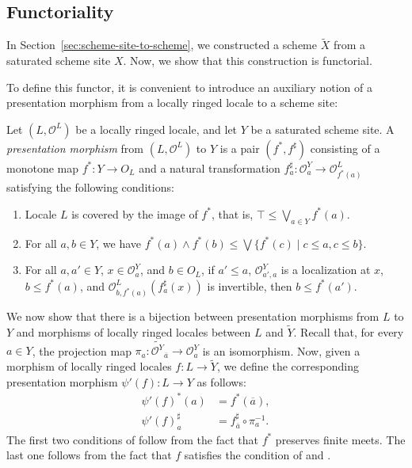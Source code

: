 \documentclass[reqno]{amsart}
\theoremstyle{definition}
\theoremstyle{remark}
\numberwithin{figure}{section}
\begin{document}
\subsection{Functoriality}
\label{sec:functor}

In Section~\ref{sec:scheme-site-to-scheme}, we constructed a scheme $\widetilde{X}$ from a saturated scheme site $X$.
Now, we show that this construction is functorial.

To define this functor, it is convenient to introduce an auxiliary notion of a presentation morphism from a locally ringed locale to a scheme site:

\begin{defn}
Let $(L,\mathcal{O}^L)$ be a locally ringed locale, and let $Y$ be a saturated scheme site.
A \emph{presentation morphism} from $(L,\mathcal{O}^L)$ to $Y$ is a pair $(f^*,f^\sharp)$ consisting of a monotone map $f^* : Y \to O_L$
and a natural transformation $f^\sharp_a : \mathcal{O}^Y_a \to \mathcal{O}^L_{f^*(a)}$ satisfying the following conditions:
\begin{enumerate}
\item \label{pres:top} Locale $L$ is covered by the image of $f^*$, that is, $\top \leq \bigvee_{a \in Y} f^*(a)$.
\item \label{pres:meet} For all $a,b \in Y$, we have $f^*(a) \wedge f^*(b) \leq \bigvee \{ f^*(c) \mid c \leq a, c \leq b \}$.
\item \label{pres:loc} For all $a,a' \in Y$, $x \in \mathcal{O}^Y_a$, and $b \in O_L$, if $a' \leq a$, $\mathcal{O}^Y_{a',a}$ is a localization at $x$,
$b \leq f^*(a)$, and $\mathcal{O}^L_{b,f^*(a)}(f^\sharp_a(x))$ is invertible, then $b \leq f^*(a')$.
\end{enumerate}
\end{defn}

We now show that there is a bijection between presentation morphisms from $L$ to $Y$ and morphisms of locally ringed locales between $L$ and $\widetilde{Y}$.
Recall that, for every $a \in Y$, the projection map $\pi_a : \widetilde{\mathcal{O}^Y}_{\overline{a}} \to \mathcal{O}^Y_a$ is an isomorphism.
Now, given a morphism of locally ringed locales $f : L \to \widetilde{Y}$, we define the corresponding presentation morphism $\psi'(f) : L \to Y$ as follows:
\begin{align*}
\psi'(f)^*(a) & = f^*(\overline{a}), \\
\psi'(f)^\sharp_a & = f^\sharp_{\overline{a}} \circ \pi_a^{-1}.
\end{align*}
The first two conditions of  follow from the fact that $f^*$ preserves finite meets.
The last one follows from the fact that $f$ satisfies the condition of  and .
\end{document}
